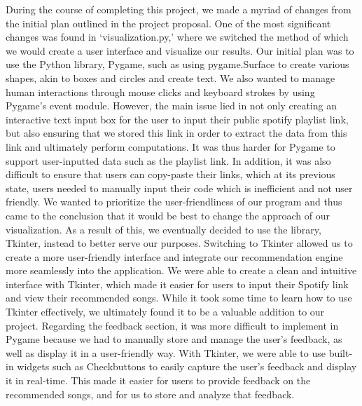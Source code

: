 \documentclass[fontsize=11pt]{article}
\begin{document}
\begin{enumerate}
During the course of completing this project, we made a myriad of changes from the initial plan outlined in the project proposal. One of the most significant changes was found in ‘visualization.py,’ where we switched the method of which we would create a user interface and visualize our results. Our initial plan was to use the Python library, Pygame, such as using pygame.Surface to create various shapes, akin to boxes and circles and create text. We also wanted to manage human interactions through mouse clicks and keyboard strokes by using Pygame’s event module. However, the main issue lied in not only creating an interactive text input box for the user to input their public spotify playlist link, but also ensuring that we stored this link in order to extract the data from this link and ultimately perform computations. It was thus harder for Pygame to support user-inputted data such as the playlist link. In addition, it was also difficult to ensure that users can copy-paste their links, which at its previous state, users needed to manually input their code which is inefficient and not user friendly. We wanted to prioritize the user-friendliness of our program and thus came to the conclusion that it would be best to change the approach of our visualization. As a result of this, we eventually decided to use the library, Tkinter, instead to better serve our purposes. Switching to Tkinter allowed us to create a more user-friendly interface and integrate our recommendation engine more seamlessly into the application. We were able to create a clean and intuitive interface with Tkinter, which made it easier for users to input their Spotify link and view their recommended songs. While it took some time to learn how to use Tkinter effectively, we ultimately found it to be a valuable addition to our project. Regarding the feedback section, it was more difficult to implement in Pygame because we had to manually store and manage the user's feedback, as well as display it in a user-friendly way. With Tkinter, we were able to use built-in widgets such as Checkbuttons to easily capture the user's feedback and display it in real-time. This made it easier for users to provide feedback on the recommended songs, and for us to store and analyze that feedback. \newline


\end{enumerate}
\end{document}
